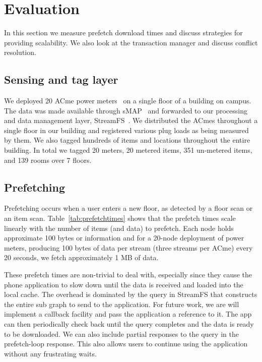 \section{Evaluation}
\label{sec:eval}


In this section we measure prefetch download times and discuss strategies for providing scalability.  We also
look at the transaction manager and discuss conflict resolution.

\subsection{Sensing and tag layer}
We deployed 20 ACme power meters~\cite{acme} on a single floor of a building on campus.  The data was made available through
sMAP~\cite{smap} and forwarded to our processing and data management layer, StreamFS~\cite{streamfs}.  We distributed
the ACmes throughout a single floor in our building and registered various plug loads as being measured by them.  We also tagged
hundreds of items and locations throughout the entire building.  In total we tagged 20 meters, 20 metered items, 351 un-metered items,
 and 139 rooms over 7 floors.

\subsection{Prefetching}
Prefetching occurs when a user enters a new floor, as detected by a floor scan or an item
scan.  Table~\ref{tab:prefetchtimes} shows that the prefetch times scale linearly with the number of
items (and data) to prefetch.  Each node holds approximate 100 bytes or information and for
a 20-node deployment of power meters, producing 100 bytes of data per stream (three streams per ACme) every 20 seconds, we fetch 
approximately 1 MB of data.

These prefetch times are non-trivial to deal with, especially since they cause the phone application to slow down
until the data is received and loaded into the local cache.  The overhead is dominated by the query in StreamFS that 
constructs the entire sub graph to send to the application.  For future work,  we are will implement a
callback facility and pass the application a reference to it.  The app can then periodically check back until
the query completes and the data is ready to be downloaded.  We can also include partial responses to the query
in the prefetch-loop response.  This also allows users to continue using the application without any frustrating waits.

